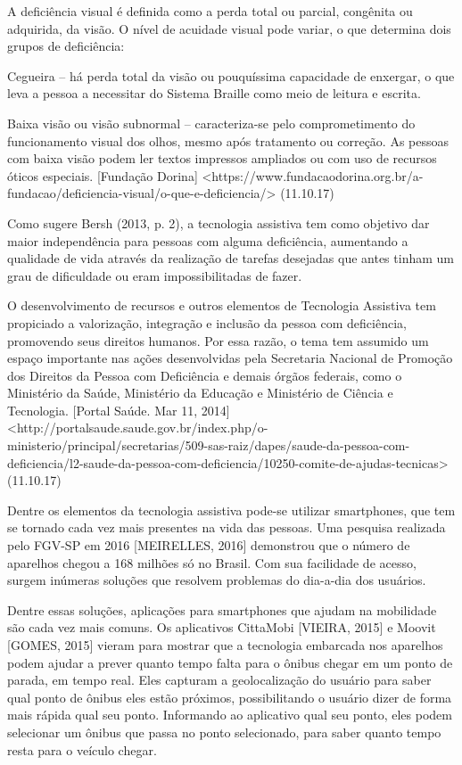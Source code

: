 \documentclass[
	12pt,				%
	oneside,			%
	a4paper,			%
	brazil				%
]{abntex2}
\begin{document}
A deficiência visual é definida como a perda total ou parcial, congênita ou adquirida, da visão. O nível de acuidade visual pode variar, o que determina dois grupos de deficiência:

Cegueira – há perda total da visão ou pouquíssima capacidade de enxergar, o que leva a pessoa a necessitar do Sistema Braille como meio de leitura e escrita.

Baixa visão ou visão subnormal – caracteriza-se pelo comprometimento do funcionamento visual dos olhos, mesmo após tratamento ou correção. As pessoas com baixa visão podem ler textos impressos ampliados ou com uso de recursos óticos especiais. [Fundação Dorina] <https://www.fundacaodorina.org.br/a-fundacao/deficiencia-visual/o-que-e-deficiencia/> (11.10.17)

Como sugere Bersh (2013, p. 2), a tecnologia assistiva tem como objetivo dar maior independência para pessoas com alguma deficiência, aumentando a qualidade de vida através da realização de tarefas desejadas que antes tinham um grau de dificuldade ou eram impossibilitadas de fazer.

O desenvolvimento de recursos e outros elementos de Tecnologia Assistiva tem propiciado a valorização, integração e inclusão da pessoa com deficiência, promovendo seus direitos humanos. Por essa razão, o tema tem assumido um espaço importante nas ações desenvolvidas pela Secretaria Nacional de Promoção dos Direitos da Pessoa com Deficiência e demais órgãos federais, como o Ministério da Saúde, Ministério da Educação e Ministério de Ciência e Tecnologia. [Portal Saúde. Mar 11, 2014] <http://portalsaude.saude.gov.br/index.php/o-ministerio/principal/secretarias/509-sas-raiz/dapes/saude-da-pessoa-com-deficiencia/l2-saude-da-pessoa-com-deficiencia/10250-comite-de-ajudas-tecnicas> (11.10.17)

	Dentre os elementos da tecnologia assistiva pode-se utilizar smartphones, que tem se tornado cada vez mais presentes na vida das pessoas. Uma pesquisa realizada pelo FGV-SP em 2016 [MEIRELLES, 2016] demonstrou que o número de aparelhos chegou a 168 milhões só no Brasil. Com sua facilidade de acesso, surgem inúmeras soluções que resolvem problemas do dia-a-dia dos usuários.

	Dentre essas soluções, aplicações para smartphones que ajudam na mobilidade são cada vez mais comuns. Os aplicativos CittaMobi [VIEIRA, 2015] e Moovit [GOMES, 2015] vieram para mostrar que a tecnologia embarcada nos aparelhos podem ajudar a prever quanto tempo falta para o ônibus chegar em um ponto de parada, em tempo real. Eles capturam a geolocalização do usuário para saber qual ponto de ônibus eles estão próximos, possibilitando o usuário dizer de forma mais rápida qual seu ponto. Informando ao aplicativo qual seu ponto, eles podem selecionar um ônibus que passa no ponto selecionado, para saber quanto tempo resta para o veículo chegar.
\end{document}
